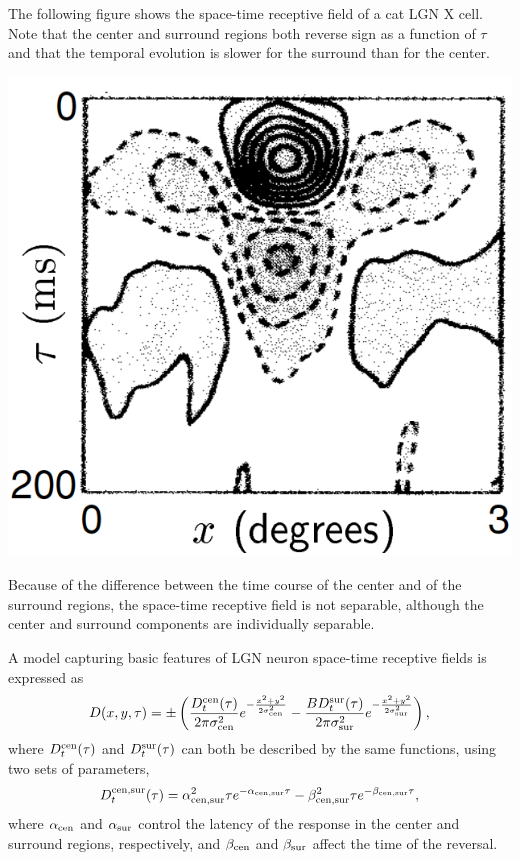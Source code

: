 \begin{exm}
  \label{exm:OFFcenterExm}
  The following figure shows the space-time receptive field of a cat LGN X cell.  Note that the center and surround regions both reverse sign as a function of $\tau$ and that the temporal evolution is slower for the surround than for the center.
  \begin{center}
    \includegraphics[scale=0.2]{./png/OFFcenterExm}
  \end{center}
  Because of the difference between the time course of the center and of the surround regions, the space-time receptive field is not separable, although the center and surround components are individually separable.
\end{exm}

\begin{defn}
  A model capturing basic features of LGN neuron space-time receptive fields is expressed as
  \begin{equation}
    \begin{aligned}
    \label{equ:2.46}
      D(x,y,\tau)=\pm\left(\frac{D_t^{\rm{cen}}(\tau)}{2\pi\sigma_{\rm{cen}}^2}e^{-\frac{x^2+y^2}{2\sigma_{\rm{cen}}^2}} - \frac{BD_t^{\rm{sur}}(\tau)}{2\pi\sigma_{\rm{sur}}^2}e^{-\frac{x^2+y^2}{2\sigma_{\rm{sur}}^2}}\right),
    \end{aligned}
  \end{equation}
  where $D_t^{\rm{cen}}(\tau)$ and $D_t^{\rm{sur}}(\tau)$ can both be described by the same functions, using two sets of parameters,
  \begin{equation}
    \label{equ:2.47}
    D_t^{\rm{cen},\rm{sur}}(\tau)=\alpha_{\rm{cen},\rm{sur}}^2\tau e^{-\alpha_{\rm{cen},\rm{sur}}\tau}-\beta_{\rm{cen},\rm{sur}}^2\tau e^{-\beta_{\rm{cen},\rm{sur}}\tau},
  \end{equation}
  where $\alpha_{\rm{cen}}$ and $\alpha_{\rm{sur}}$ control the latency of the response in the center and surround regions, respectively, and $\beta_{\rm{cen}}$ and $\beta_{\rm{sur}}$ affect the time of the reversal.
\end{defn}

